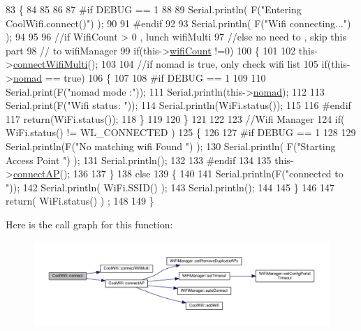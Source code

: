 \begin{DoxyCode}
83 \{       
84 
85 
86 
87 \textcolor{preprocessor}{#if DEBUG == 1 }
88 
89     Serial.println( F(\textcolor{stringliteral}{"Entering CoolWifi.connect()"}) );
90 
91 \textcolor{preprocessor}{#endif}
92 
93     Serial.println( F(\textcolor{stringliteral}{"Wifi connecting..."}) );
94 
95 
96     \textcolor{comment}{//if WifiCount > 0 , lunch wifiMulti}
97     \textcolor{comment}{//else no need to , skip this part}
98     \textcolor{comment}{// to wifiManager  }
99     \textcolor{keywordflow}{if}(this->\hyperlink{class_cool_wifi_ab133bd92fcb895b884deecd6678592e4}{wifiCount} !=0)
100     \{
101     
102         this->\hyperlink{class_cool_wifi_a419de92d738f14b7444cf822b3ab0070}{connectWifiMulti}();
103         
104         \textcolor{comment}{//if nomad is true, only check wifi list}
105         \textcolor{keywordflow}{if}(this->\hyperlink{class_cool_wifi_ab7d9643c4af7bac3be331ef008b2ea27}{nomad} == \textcolor{keyword}{true})
106         \{
107     
108 \textcolor{preprocessor}{        #if DEBUG == 1}
109     
110             Serial.print(F(\textcolor{stringliteral}{"nomad mode :"}));
111             Serial.println(this->\hyperlink{class_cool_wifi_ab7d9643c4af7bac3be331ef008b2ea27}{nomad});
112         
113             Serial.print(F(\textcolor{stringliteral}{"Wifi status: "}));
114             Serial.println(WiFi.status());
115         
116 \textcolor{preprocessor}{        #endif  }
117             \textcolor{keywordflow}{return}(WiFi.status());  
118         \}
119 
120     \}
121 
122 
123     \textcolor{comment}{//Wifi Manager}
124     \textcolor{keywordflow}{if}( WiFi.status() != WL\_CONNECTED ) 
125     \{
126 
127 \textcolor{preprocessor}{    #if DEBUG == 1 }
128     
129         Serial.println(F(\textcolor{stringliteral}{"No matching wifi Found "}) );
130         Serial.println( F(\textcolor{stringliteral}{"Starting Access Point "}) );  
131         Serial.println();
132 
133 \textcolor{preprocessor}{    #endif}
134         
135         this->\hyperlink{class_cool_wifi_a7c857f27161782f5ef1d62d552aff971}{connectAP}();     
136         
137     \}
138     \textcolor{keywordflow}{else}
139     \{
140 
141         Serial.println(F(\textcolor{stringliteral}{"connected to "}));
142         Serial.println( WiFi.SSID() );
143         Serial.println();
144     
145     \}
146     
147     \textcolor{keywordflow}{return}( WiFi.status() ) ;
148 
149 \}
\end{DoxyCode}
Here is the call graph for this function\+:\nopagebreak
\begin{figure}[H]
\begin{center}
\leavevmode
\includegraphics[width=350pt]{d7/d29/class_cool_wifi_ad060353050f40d032a2dbf9e54a768bf_cgraph}
\end{center}
\end{figure}
